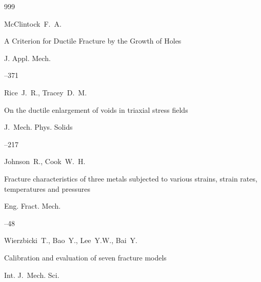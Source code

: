\begin{thebibliography}{999}





\by McClintock~F.~A. 

\paper A Criterion for Ductile Fracture by the Growth of Holes

\jour J. Appl. Mech.  




--371





\by Rice~J.~R., Tracey~D.~M.

\paper On the ductile enlargement of voids in triaxial stress fields

\jour J.~Mech. Phys. Solids




--217





\by Johnson~R., Cook~W.~H. 

\paper Fracture characteristics of three metals subjected to various strains, strain rates, temperatures and pressures

\jour Eng. Fract. Mech.




--48





\by Wierzbicki~T., Bao~Y., Lee~Y.W., Bai~Y.  

\paper Calibration and evaluation of seven fracture models

\jour Int. J.~Mech. Sci.





\end{thebibliography}
